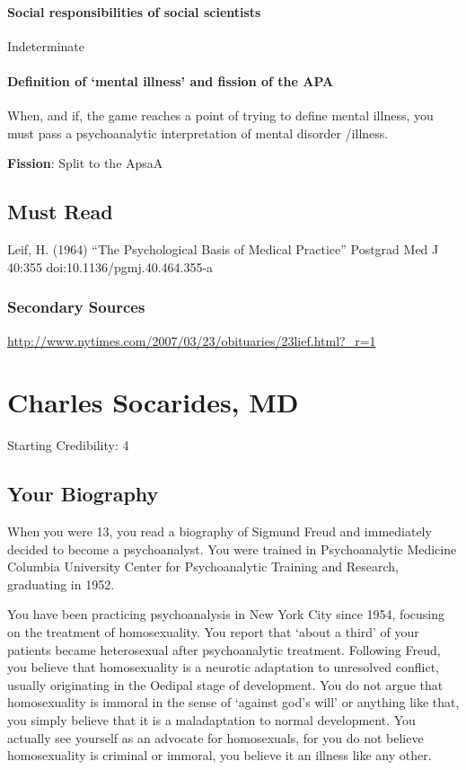 \begin{refsection}
\subsubsection{Social responsibilities of social scientists}
\label{socialresponsibilitiesofsocialscientists}

Indeterminate

\subsubsection{Definition of ‘mental illness’ and fission of the APA}
\label{definitionof‘mentalillness’andfissionoftheapa}

When, and if, the game reaches a point of trying to define mental illness, you must pass a psychoanalytic interpretation of mental disorder \slash  illness.

\textbf{Fission}: Split to the ApsaA

\section{Must Read}
\label{mustread}

Leif, H. (1964) “The Psychological Basis of Medical Practice” Postgrad Med J 40:355 doi:10.1136\slash pgmj.40.464.355-a

\subsection{Secondary Sources}
\label{secondarysources}

\url{http://www.nytimes.com/2007/03/23/obituaries/23lief.html?_r=1}

\chapter{Charles Socarides, MD}
\label{charlessocaridesmd}

Starting Credibility: 4

\section{Your Biography}
\label{yourbiography}

When you were 13, you read a biography of Sigmund Freud and immediately decided to become a psychoanalyst. You were trained in Psychoanalytic Medicine Columbia University Center for Psychoanalytic Training and Research, graduating in 1952.

You have been practicing psychoanalysis in New York City since 1954, focusing on the treatment of homosexuality. You report that `about a third' of your patients became heterosexual after psychoanalytic treatment. Following Freud, you believe that homosexuality is a neurotic adaptation to unresolved conflict, usually originating in the Oedipal stage of development. You do not argue that homosexuality is immoral in the sense of `against god's will' or anything like that, you simply believe that it is a maladaptation to normal development. You actually see yourself as an advocate for homosexuals, for you do not believe homosexuality is criminal or immoral, you believe it an illness like any other.


\end{refsection}

